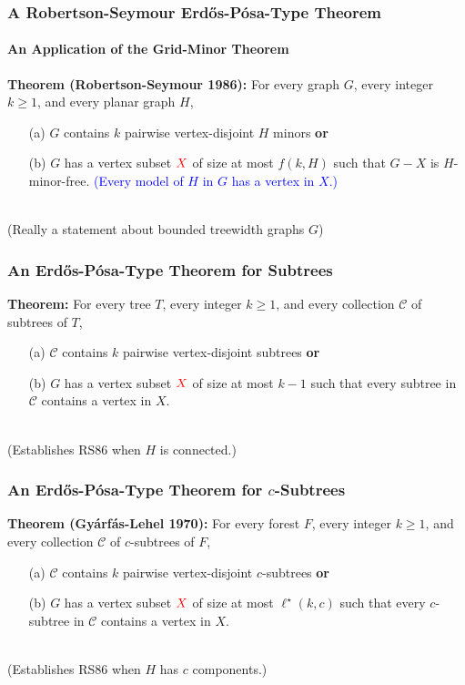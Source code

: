 \documentclass{beamer}
\begin{document}
\begin{frame}
  \frametitle{A Robertson-Seymour Erdős-Pósa-Type Theorem}
  \framesubtitle{An Application of the Grid-Minor Theorem}

  \noindent\textbf{Theorem (Robertson-Seymour 1986):} For every graph $G$, every integer $k\ge 1$,  and every planar graph $H$,
  \begin{enumerate}%
    \item[(a)] $G$ contains $k$ pairwise vertex-disjoint $H$ minors \textbf{or}
    \item[(b)] $G$ has a vertex subset $\mathcolor{red}{X}$ of size at most $f(k,H)$ such that $G-X$ is $H$-minor-free. \textcolor{blue}{(Every model of $H$ in $G$ has a vertex in $X$.)}
  \end{enumerate}
  \ \\[3ex]
  (Really a statement about bounded treewidth graphs $G$)
\end{frame}


\begin{frame}
  \frametitle{An Erdős-Pósa-Type Theorem for Subtrees}


  \noindent\textbf{Theorem:} For every tree $T$, every integer $k\ge 1$,  and every collection $\mathcal{C}$ of subtrees of $T$,
  \begin{enumerate}%
    \item[(a)] $\mathcal{C}$ contains $k$ pairwise vertex-disjoint subtrees \textbf{or}
    \item[(b)] $G$ has a vertex subset $\mathcolor{red}{X}$ of size at most $k-1$ such that every subtree in $\mathcal{C}$ contains a vertex in $X$.
  \end{enumerate}
  \ \\[3ex]
  (Establishes RS86 when $H$ is connected.)
\end{frame}


\begin{frame}
  \frametitle{An Erdős-Pósa-Type Theorem for $c$-Subtrees}


  \noindent\textbf{Theorem (Gyárfás-Lehel 1970):} For every forest $F$, every integer $k\ge 1$, and every collection $\mathcal{C}$ of $c$-subtrees of $F$,
  \begin{enumerate}%
    \item[(a)] $\mathcal{C}$ contains $k$ pairwise vertex-disjoint $c$-subtrees \textbf{or}
    \item[(b)] $G$ has a vertex subset $\mathcolor{red}{X}$ of size at most $\ell^\star(k,c)$ such that every $c$-subtree in $\mathcal{C}$ contains a vertex in $X$.
  \end{enumerate}
  \ \\[3ex]
  (Establishes RS86 when $H$ has $c$ components.)
\end{frame}
\end{document}
